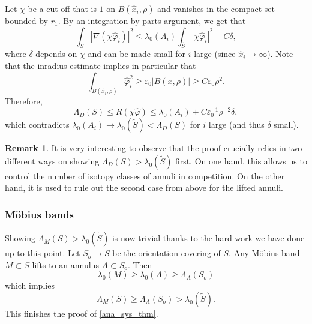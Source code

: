 \documentclass[a4paper,11pt]{amsart}
\numberwithin{equation}{section}
\theoremstyle{definition}
\newtheorem{rem}[equation]{Remark}
\def\ve{\varepsilon}
\begin{document}
Let $\chi$ be a cut off that is $1$ on $B(\hat x_i,\rho)$ and vanishes in the compact set bounded by $r_1$.
By an integration by parts argument, we get that
\begin{equation*}
\int_{\hat S} |\nabla (\chi \hat \varphi_i)|^2 \leq \lambda_0(A_i) \int_{\hat S} | \chi \hat \varphi_i|^2 + C \delta,
\end{equation*}
where $\delta$ depends on $\chi$ and can be made small for $i$ large (since $\hat x_i \to \infty$).
Note that the inradius estimate implies in particular that
\begin{equation*}
\int_{B(\hat x_i,\rho)} \hat \varphi_i^2 \geq \ve_0 |B(x,\rho)| \geq C \ve_0 \rho^2.
\end{equation*}
Therefore,
\begin{equation*}
\Lambda_D(S) \leq R(\chi \hat \varphi) \leq \lambda_0(A_i) + C  \ve_0^{-1} \rho^{-2} \delta,
\end{equation*}
which contradicts $\lambda_0(A_i) \to \lambda_0(\tilde S) < \Lambda_D(S)$ for $i$ large (and thus $\delta$ small).

\begin{rem}
It is very interesting to observe that the proof crucially relies in two different ways 
on showing $\Lambda_D(S)>\lambda_0(\tilde S)$ first.
On one hand, this allows us to control the number of isotopy classes of annuli in competition.
On the other hand, it is used to rule out the second case from above for the lifted annuli.
\end{rem}

\subsubsection{M\"obius bands}

Showing $\Lambda_M(S)>\lambda_0(\tilde S)$ is now trivial thanks to the hard work we have done up to this point.
Let $S_o\to S$ be the orientation covering of $S$.
Any M\"obius band $M\subset S$ lifts to an annulus $A \subset S_o$.
Then
\begin{equation*}
\lambda_0(M) \geq \lambda_0(A) \geq \Lambda_A(S_o) 
\end{equation*}
which implies
\begin{equation*}
\Lambda_M(S) \geq \Lambda_A(S_o) > \lambda_0(\tilde S).
\end{equation*}
This finishes the proof of \cref{ana_sys_thm}.
\end{document}

